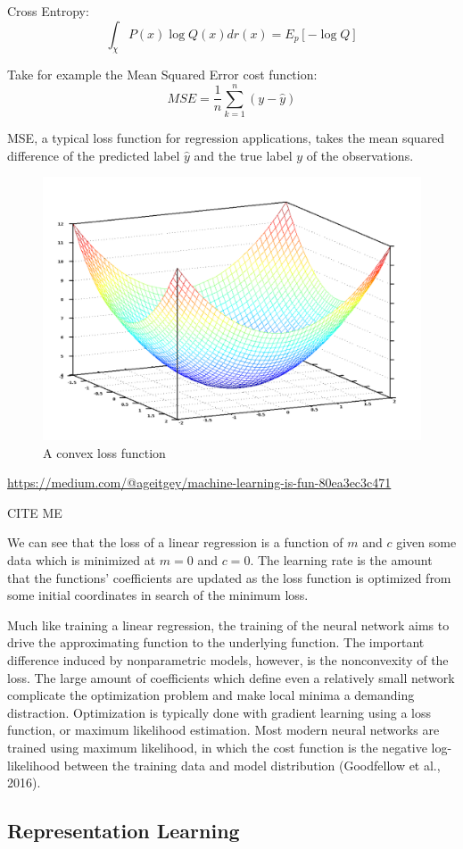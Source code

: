 \documentclass[12pt,twoside]{reedthesis}
\begin{document}
Cross Entropy: \[
\int_\chi P(x) \log Q (x) dr(x) = E_p [- \log Q]
\]

Take for example the Mean Squared Error cost function: \[
MSE = \frac{1}{n} \sum_{k=1}^n  (y - \hat y)
\]

MSE, a typical loss function for regression applications, takes the mean
squared difference of the predicted label \(\hat y\) and the true label
\(y\) of the observations.
\begin{figure}
\includegraphics[width=0.4\linewidth]{figure/optimize} \caption{A convex loss function}\label{fig:optimize}
\end{figure}
\url{https://medium.com/@ageitgey/machine-learning-is-fun-80ea3ec3c471}

CITE ME

We can see that the loss of a linear regression is a function of \(m\)
and \(c\) given some data which is minimized at \(m = 0\) and \(c = 0\).
The learning rate is the amount that the functions' coefficients are
updated as the loss function is optimized from some initial coordinates
in search of the minimum loss.

Much like training a linear regression, the training of the neural
network aims to drive the approximating function to the underlying
function. The important difference induced by nonparametric models,
however, is the nonconvexity of the loss. The large amount of
coefficients which define even a relatively small network complicate the
optimization problem and make local minima a demanding distraction.
Optimization is typically done with gradient learning using a loss
function, or maximum likelihood estimation. Most modern neural networks
are trained using maximum likelihood, in which the cost function is the
negative log-likelihood between the training data and model distribution
(Goodfellow et al., 2016).

\subsection{Representation Learning}\label{representation-learning}
\end{document}
